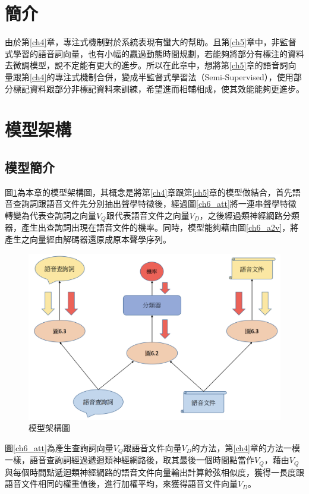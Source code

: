 \label{ch6}
\section{簡介}
由於第\ref{ch4}章，專注式機制對於系統表現有蠻大的幫助。且第\ref{ch5}章中，非監督式學習的語音詞向量，也有小幅的贏過動態時間規劃，若能夠將部分有標注的資料去微調模型，說不定能有更大的進步。所以在此章中，想將第\ref{ch5}章的語音詞向量跟第\ref{ch4}的專注式機制合併，變成半監督式學習法（Semi-Supervised），使用部分標記資料跟部分非標記資料來訓練，希望進而相輔相成，使其效能能夠更進步。
\section{模型架構}
\subsection{模型簡介}
圖\ref{ch6_model}為本章的模型架構圖，其概念是將第\ref{ch4}章跟第\ref{ch5}章的模型做結合，首先語音查詢詞跟語音文件先分別抽出聲學特徵後，經過圖\ref{ch6_att}將一連串聲學特徵轉變為代表查詢詞之向量$V_Q$跟代表語音文件之向量$V_D$，之後經過類神經網路分類器，產生出查詢詞出現在語音文件的機率。同時，模型能夠藉由圖\ref{ch6_a2v}，將產生之向量經由解碼器還原成原本聲學序列。

\begin{figure}
\centering
\includegraphics[scale=0.5]{images/ch6_model.png} 
\caption{模型架構圖}
\label{ch6_model}
\end{figure}
圖\ref{ch6_att}為產生查詢詞向量$V_Q$跟語音文件向量$V_D$的方法，第\ref{ch4}章的方法一模一樣，語音查詢詞經過遞迴類神經網路後，取其最後一個時間點當作$V_Q$，藉由$V_Q$與每個時間點遞迴類神經網路的語音文件向量輸出計算餘弦相似度，獲得一長度跟語音文件相同的權重值後，進行加權平均，來獲得語音文件向量$V_D$。

